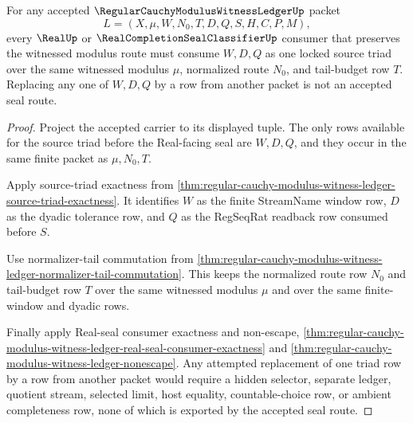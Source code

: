 \begin{theorem}
\label{thm:regular-cauchy-modulus-witness-ledger-source-triad-lock}
For any accepted $\RegularCauchyModulusWitnessLedgerUp$ packet
$$
L=(X,\mu,W,N_0,T,D,Q,S,H,C,P,M),
$$
every $\RealUp$ or $\RealCompletionSealClassifierUp$ consumer that preserves the witnessed modulus route must consume $W,D,Q$ as one locked source triad over the same witnessed modulus $\mu$, normalized route $N_0$, and tail-budget row $T$. Replacing any one of $W,D,Q$ by a row from another packet is not an accepted seal route.
\end{theorem}
\begin{proof}
Project the accepted carrier to its displayed tuple. The only rows available for the source triad before the Real-facing seal are $W,D,Q$, and they occur in the same finite packet as $\mu,N_0,T$.

Apply source-triad exactness from \autoref{thm:regular-cauchy-modulus-witness-ledger-source-triad-exactness}. It identifies $W$ as the finite StreamName window row, $D$ as the dyadic tolerance row, and $Q$ as the RegSeqRat readback row consumed before $S$.

Use normalizer-tail commutation from \autoref{thm:regular-cauchy-modulus-witness-ledger-normalizer-tail-commutation}. This keeps the normalized route row $N_0$ and tail-budget row $T$ over the same witnessed modulus $\mu$ and over the same finite-window and dyadic rows.

Finally apply Real-seal consumer exactness and non-escape, \autoref{thm:regular-cauchy-modulus-witness-ledger-real-seal-consumer-exactness} and \autoref{thm:regular-cauchy-modulus-witness-ledger-nonescape}. Any attempted replacement of one triad row by a row from another packet would require a hidden selector, separate ledger, quotient stream, selected limit, host equality, countable-choice row, or ambient completeness row, none of which is exported by the accepted seal route.
\end{proof}

